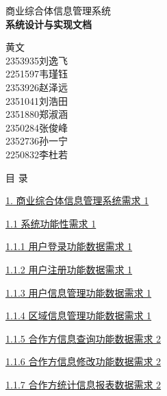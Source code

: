 \documentclass[]{article}
\date{}
\begin{document}
\begin{center}
\protect\hypertarget{_Hlk208135206}{}{}
{\fontsize{24}{30}\selectfont 商业综合体信息管理系统}\\[8pt]
{\fontsize{18}{28}\selectfont\textbf{系统设计与实现文档}}\\[12pt]
{\begin{spacing}{1.6}\fontsize{18}{28}\quad 黄文\\
2353935\quad 刘逸飞\\
2251597\quad 韦瑾钰\\
2353926\quad 赵泽远\\
2351041\quad 刘浩田\\
2351880\quad 郑淑涵\\
2350284\quad 张俊峰\\
2352736\quad 孙一宁\\
2250832\quad 李杜若
\end{spacing}}
\end{center}

\newpage



\bigskip
目 录

\protect\hyperlink{_Toc77076512}{{1.} 商业综合体信息管理{系统需求} 1}

\protect\hyperlink{ux7cfbux7edfux529fux80fdux6027ux9700ux6c42}{1.1
  系统功能性需求 1}

\protect\hyperlink{ux7528ux6237ux767bux5f55ux529fux80fdux6570ux636eux9700ux6c42}{1.1.1
  用户登录功能数据需求 1}

\protect\hyperlink{ux7528ux6237ux6ce8ux518cux529fux80fdux6570ux636eux9700ux6c42}{1.1.2
  用户注册功能数据需求 1}

\protect\hyperlink{ux7528ux6237ux4fe1ux606fux7ba1ux7406ux529fux80fdux6570ux636eux9700ux6c42}{1.1.3
  用户信息管理功能数据需求 1}

\protect\hyperlink{ux533aux57dfux4fe1ux606fux7ba1ux7406ux529fux80fdux6570ux636eux9700ux6c42}{1.1.4
  区域信息管理功能数据需求 1}

\protect\hyperlink{ux5408ux4f5cux65b9ux4fe1ux606fux67e5ux8be2ux529fux80fdux6570ux636eux9700ux6c42}{1.1.5
  合作方信息查询功能数据需求 2}

\protect\hyperlink{ux5408ux4f5cux65b9ux4fe1ux606fux4feeux6539ux529fux80fdux6570ux636eux9700ux6c42}{1.1.6
  合作方信息修改功能数据需求 2}

\protect\hyperlink{ux5408ux4f5cux65b9ux7edfux8ba1ux4fe1ux606fux62a5ux8868ux6570ux636eux9700ux6c42}{1.1.7
  合作方统计信息报表数据需求 2}
\end{document}
